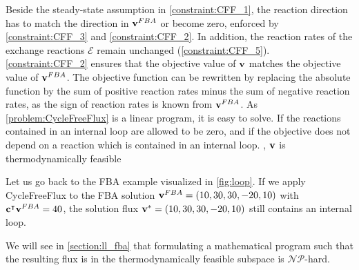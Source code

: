 
Beside the steady-state assumption in \cref{constraint:CFF_1}, the reaction direction has to match the direction in $\bold v^{FBA}$ or become zero, enforced by \cref{constraint:CFF_3} and \cref{constraint:CFF_2}. In addition, the reaction rates of the exchange reactions $\mathcal{E}$ remain unchanged (\cref{constraint:CFF_5}).
\cref{constraint:CFF_2} ensures that the objective value of $\bold v$ matches the objective value of $\bold v^{FBA}$. The objective function can be rewritten by replacing the absolute function by the sum of positive reaction rates minus the sum of negative reaction rates, as the sign of reaction rates is known from $\bold v^{FBA}$. As \cref{problem:CycleFreeFlux} is a linear program, it is easy to solve. 
If the reactions contained in an internal loop are allowed to be zero, and  if the objective does not depend on a reaction which is contained in an internal loop. %
, $\bold v$ is thermodynamically feasible \cite{noor_removing_2018} 

Let us go back to the FBA example visualized in \cref{fig:loop}. If we apply CycleFreeFlux to the FBA solution $\bold v^{FBA} = (10,30,30,-20,10)$ with $\bold c^\intercal \bold v^{FBA} = 40$, the solution flux 
$\bold v^* = (10,30,30,-20,10)$ still contains an internal loop.

We will see in \cref{section:ll_fba} that formulating a mathematical program such that the resulting flux is in the thermodynamically feasible subspace is $\mathcal{NP}$-hard.





